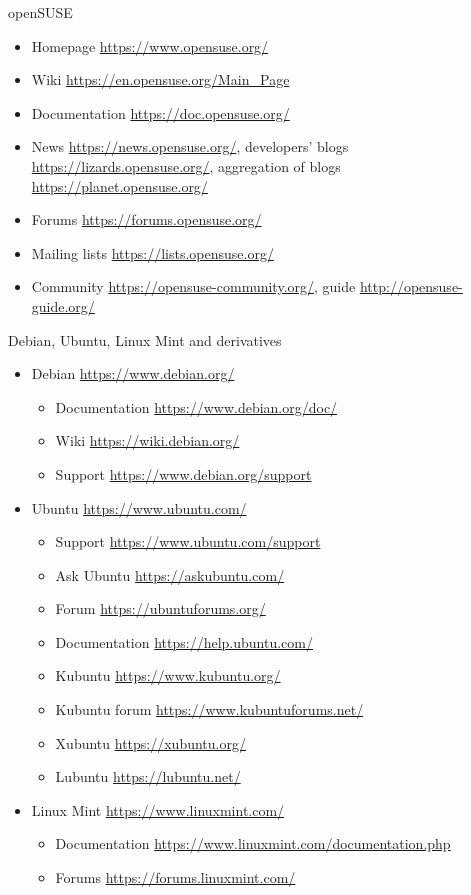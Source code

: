 \documentclass[compress, ucs, xelatex, 11pt, xcolor=svgnames,
  hyperref={
    bookmarks=true,
    unicode=true,
    colorlinks=true,
    pdftitle={Linux, command line and MetaCentrum},
    plainpages=false,
    pdfauthor={Vojtech Zeisek},
    pdfsubject={Course about use of Linux command line, writing shell scripts and using MetaCentrum of CESNET},
    pdfcreator={XeLaTeX},
    pdfkeywords={Linux, GNU, BASH, shell, command line, MetaCentrum},
    linkcolor=DarkRed,
    anchorcolor=DarkBlue,
    citecolor=Indigo,
    filecolor=NavyBlue,
    menucolor=DarkMagenta,
    urlcolor=DarkBlue,
    pdftex},
  url={hyphens, lowtilde} %
  ]{beamer}
\begin{document}
\begin{frame}{openSUSE}
  \begin{itemize}
    \item Homepage \url{https://www.opensuse.org/}
    \item Wiki \url{https://en.opensuse.org/Main_Page}
    \item Documentation \url{https://doc.opensuse.org/}
    \item News \url{https://news.opensuse.org/}, developers' blogs \url{https://lizards.opensuse.org/}, aggregation of blogs \url{https://planet.opensuse.org/}
    \item Forums \url{https://forums.opensuse.org/}
    \item Mailing lists \url{https://lists.opensuse.org/}
    \item Community \url{https://opensuse-community.org/}, guide \url{http://opensuse-guide.org/}
  \end{itemize}
\end{frame}

\begin{frame}{Debian, Ubuntu, Linux Mint and derivatives}
  \begin{itemize}
    \item Debian \url{https://www.debian.org/}
    \begin{itemize}
      \item Documentation \url{https://www.debian.org/doc/}
      \item Wiki \url{https://wiki.debian.org/}
      \item Support \url{https://www.debian.org/support}
    \end{itemize}
    \item Ubuntu \url{https://www.ubuntu.com/}
    \begin{itemize}
      \item Support \url{https://www.ubuntu.com/support}
      \item Ask Ubuntu \url{https://askubuntu.com/}
      \item Forum \url{https://ubuntuforums.org/}
      \item Documentation \url{https://help.ubuntu.com/}
      \item Kubuntu \url{https://www.kubuntu.org/}
      \item Kubuntu forum \url{https://www.kubuntuforums.net/}
      \item Xubuntu \url{https://xubuntu.org/}
      \item Lubuntu \url{https://lubuntu.net/}
    \end{itemize}
    \item Linux Mint \url{https://www.linuxmint.com/}
    \begin{itemize}
      \item Documentation \url{https://www.linuxmint.com/documentation.php}
      \item Forums \url{https://forums.linuxmint.com/}
    \end{itemize}
  \end{itemize}
\end{frame}
\end{document}
